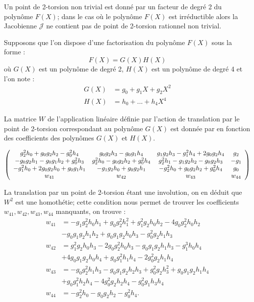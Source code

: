 \documentclass[a4paper]{article}
\theoremstyle{definition}
\theoremstyle{remark}
\numberwithin{equation}{section}
\begin{document}
Un point de 2-torsion non trivial est donné par un facteur de degré 2 du polynôme $F(X)$; dans le cas où le polynôme $F(X)$ est irréductible alors la Jacobienne $\mathcal{J}$ ne contient pas de point de 2-torsion rationnel non trivial.

Supposons que l'on dispose d'une factorisation du polynôme $F(X)$ sous la forme :
$$F(X) = G(X)H(X)$$
où $G(X)$ est un polynôme de degré 2, $H(X)$ est un polynôme de degré 4 et l'on note :
\begin{align*}
G(X) &= g_0 + g_1X + g_2X^2 \\
H(X) &= h_0 + ... + h_4X^4
\end{align*}

La matrice $W$ de l'application linéaire définie par l'action de translation par le point de 2-torsion correspondant au polynôme $G(X)$ est donnée par \citet{eqKum} en fonction des coefficients des polynômes $G(X)$ et $H(X)$.

\[ \left(
  \begin{array}{ c c c c}
     g_2^2h_0 + g_0g_2h_2 - g_0^2h_4 & g_0g_2h_3 - g_0g_1h_4 & g_1g_2h_3 - g_1^2h_4 + 2g_0g_2h_4  & g_2  \\
     -g_0g_2h_1 - g_0g_1h_2 + g_0^2h_3 & g_2^2h_0 - g_0g_2h_2 + g_0^2h_4  & g_2^2h_1 - g_1g_2h_2 - g_0g_2h_3  & -g_1  \\
     -g_1^2h_0 + 2g_0g_2h_0 + g_0g_1h_1 & -g_1g_2h_0 + g_0g_2h_1  & -g_2^2h_0 + g_0g_2h_2 + g_0^2h_4  & g_0 \\
     w_{41} & w_{42}   & w_{43}  & w_{44}  \\
  \end{array} \right)
\]

La translation par un point de 2-torsion étant une involution, on en déduit que $W^2$ est une homothétie; cette condition nous permet de trouver les coefficients $w_{41},w_{42} ,w_{43},w_{44}$ manquants, on trouve :
\begin{align*}
w_{41} &= -g_1g_2^2h_0h_1 + g_0g_2^2h_1^2 + g_1^2g_2h_0h_2 - 4g_0g_2^2h_0h_2 \\
    &   -g_0g_1g_2h_1h_2 + g_0g_1g_2h_0h_3 - g_0^2g_2h_1h_3      \\
w_{42} &= g_1^2g_2h_0h_3 - 2g_0g_2^2h_0h_3 - g_0g_1g_2h_1h_3 - g_1^3h_0h_4 \\
    &+ 4g_0g_1g_2h_0h_4 + g_0g_1^2h_1h_4 - 2g_0^2g_2h_1h_4     \\
w_{43} &= -g_0g_2^2h_1h_3 - g_0g_1g_2h_2h_3 + g_0^2g_2h_3^2 + g_0g_1g_2h_1h_4 \\
    & + g_0g_1^2h_2h_4 - 4g_0^2g_2h_2h_4 - g_0^2g_1h_3h_4        \\        
w_{44} &= -g_2^2h_0 - g_0g_2h_2 - g_0^2h_4.
\end{align*}
\end{document}
